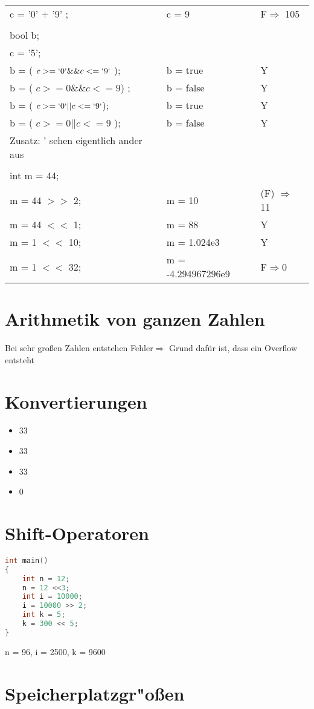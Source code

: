 \documentclass[a4paper,11pt,titlepage]{article}
\begin{document}
\begin{tabular}{lll}
c = '0' + '9' ;	&c = 9&F$\Rightarrow$ 105\\
\\
bool b;\\
c = '5';\\							
b = ( $c >= `0`\&\& c <= `9`$ );&b = true&Y\\
b = ( $c >= 0 \&\& c <= 9$) ;&b = false&Y\\	
b = ( $c >= `0` || c <= `9`$);&b = true&Y\\
b = ( $c >= 0 | | c <= 9$ );&b = false&Y\\
Zusatz: ' sehen eigentlich ander aus\\
\\
int m = 44;\\
m = 44 $>>$ 2;&m = 10&(F) $\Rightarrow$ 11\\
m = 44 $<<$ 1;&m = 88&Y\\
m = 1 $<<$ 10;&m = 1.024e3&Y\\
m = 1 $<<$ 32;&m = -4.294967296e9&F$\Rightarrow$0
\end{tabular}
\section{Arithmetik von ganzen Zahlen}
Bei sehr großen Zahlen entstehen Fehler$\Rightarrow$ Grund dafür ist, dass ein Overflow entsteht
\section{Konvertierungen}
\begin{itemize}
\item 33
\item 33
\item 33
\item 0
\end{itemize}
\section{Shift-Operatoren}
\begin{lstlisting}[language=c++]
int main()
{
    int n = 12;
    n = 12 <<3;
    int i = 10000;
    i = 10000 >> 2;
    int k = 5;
    k = 300 << 5;
}	
\end{lstlisting}
n = 96, i = 2500, k = 9600
\section{Speicherplatzgr"oßen}

\end{document}
